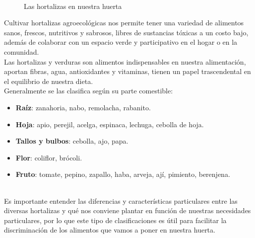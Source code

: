 \documentclass[../main.tex]{subfiles}
\begin{document}
\hfill\\

\begin{wrapfigure}[13]{o}[0cm]{0.45\textwidth}
    \centering
    \caption*{\color{CompostGreen!50!black}Las hortalizas en nuestra huerta}
    \label{hortalizas1}
\end{wrapfigure}


Cultivar hortalizas agroecológicas nos permite tener una variedad de alimentos sanos, frescos, nutritivos y sabrosos, libres de sustancias tóxicas a un costo bajo, además de colaborar con un espacio verde y participativo en el hogar o en la comunidad. \\

Las hortalizas y verduras son alimentos indispensables en nuestra alimentación, aportan fibras, agua, antioxidantes y vitaminas, tienen  un papel trascendental en el equilibrio de nuestra dieta.\\


Generalmente se las clasifica según su parte comestible: 
\hfill\\
\begin{itemize}
    \item \textbf{Raíz}: zanahoria, nabo, remolacha, rabanito.
    \item \textbf{Hoja}: apio, perejil, acelga, espinaca, lechuga, cebolla de hoja.
    \item \textbf{Tallos y bulbos}: cebolla, ajo, papa.
    \item \textbf{Flor}: coliflor, brócoli.
    \item \textbf{Fruto}: tomate, pepino, zapallo, haba, arveja, ají, pimiento, berenjena.
\end{itemize}

\hfill\\

Es importante entender las diferencias y características particulares entre las diversas hortalizas y qué nos conviene plantar en función de nuestras necesidades particulares, por lo que este tipo de clasificaciones es útil para facilitar la discriminación de los alimentos que vamos a poner en nuestra huerta.
\end{document}
